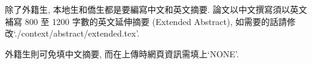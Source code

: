\StartAbstractChi

除了外籍生, 本地生和僑生都是要編寫中文和英文摘要. 論文以中文撰寫須以英文補寫 800 至 1200 字數的英文延伸摘要 (Extended Abstract), 如需要的話請修改`./context/abstract/extended.tex'.

外籍生則可免填中文摘要, 而在上傳時網頁資訊需填上`NONE'.\\

\EndAbstractChi
